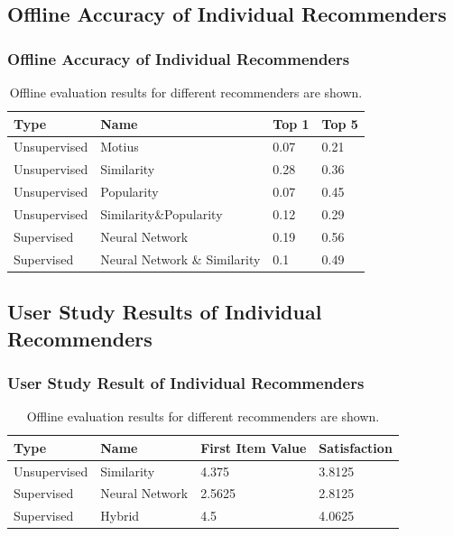 \documentclass{beamer}
\begin{document}
\subsection{Offline Accuracy of Individual Recommenders} 
\begin{frame}
   \frametitle{Offline Accuracy of Individual Recommenders}
\begin{table}[htp]
	\caption{Offline evaluation results for different recommenders are shown.}
	\centering
	\begin{tabular}{|l|l|l|l|}
		\hline
		Type         & Name           & Top 1 & Top 5 \\ \hline
		Unsupervised & Motius         & 0.07  & 0.21  \\ \hline
		Unsupervised & Similarity     & 0.28  & 0.36  \\ \hline
		Unsupervised & Popularity     & 0.07  & 0.45  \\ \hline
		Unsupervised & Similarity\&Popularity         & 0.12  & 0.29  \\ \hline
		Supervised   & Neural Network & 0.19  & 0.56  \\ \hline
		Supervised   & Neural Network \& Similarity & 0.1  & 0.49  \\ \hline
	\end{tabular}
	\label{discussion:accuracy-offline}
\end{table}
\end{frame}

\subsection{User Study Results of Individual Recommenders} 
\begin{frame}
\frametitle{User Study Result of Individual Recommenders}
\begin{table}[htp]
	\caption{Offline evaluation results for different recommenders are shown.}
	\centering
	\begin{tabular}{|l|l|l|l|}
		\hline
		Type         & Name           & First Item Value & Satisfaction \\ \hline
		Unsupervised & Similarity     & 4.375  & 3.8125  \\ \hline
		Supervised   & Neural Network & 2.5625  & 2.8125  \\ \hline
		Supervised   & Hybrid & 4.5  & 4.0625  \\ \hline
	\end{tabular}
	\label{discussion:accuracy-offline}
\end{table}
\end{frame}
\end{document}
